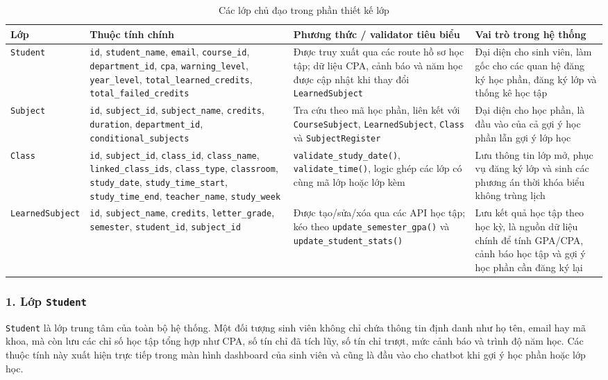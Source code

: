 \documentclass[12pt,a4paper]{report}
\begin{document}
\begin{table}[H]
\centering
\renewcommand{\arraystretch}{1.35}
\begin{tabularx}{\textwidth}{|l|X|X|X|}
\hline
\rowcolor[HTML]{D9EAD3}
\textbf{Lớp} & \textbf{Thuộc tính chính} & \textbf{Phương thức / validator tiêu biểu} & \textbf{Vai trò trong hệ thống} \\ \hline
\texttt{Student} & \texttt{id}, \texttt{student\_name}, \texttt{email}, \texttt{course\_id}, \texttt{department\_id}, \texttt{cpa}, \texttt{warning\_level}, \texttt{year\_level}, \texttt{total\_learned\_credits}, \texttt{total\_failed\_credits} & Được truy xuất qua các route hồ sơ học tập; dữ liệu CPA, cảnh báo và năm học được cập nhật khi thay đổi \texttt{LearnedSubject} & Đại diện cho sinh viên, làm gốc cho các quan hệ đăng ký học phần, đăng ký lớp và thống kê học tập \\ \hline
\texttt{Subject} & \texttt{id}, \texttt{subject\_id}, \texttt{subject\_name}, \texttt{credits}, \texttt{duration}, \texttt{department\_id}, \texttt{conditional\_subjects} & Tra cứu theo mã học phần, liên kết với \texttt{CourseSubject}, \texttt{LearnedSubject}, \texttt{Class} và \texttt{SubjectRegister} & Đại diện cho học phần, là đầu vào của cả gợi ý học phần lẫn gợi ý lớp học \\ \hline
\texttt{Class} & \texttt{id}, \texttt{subject\_id}, \texttt{class\_id}, \texttt{class\_name}, \texttt{linked\_class\_ids}, \texttt{class\_type}, \texttt{classroom}, \texttt{study\_date}, \texttt{study\_time\_start}, \texttt{study\_time\_end}, \texttt{teacher\_name}, \texttt{study\_week} & \texttt{validate\_study\_date()}, \texttt{validate\_time()}, logic ghép các lớp có cùng mã lớp hoặc lớp kèm & Lưu thông tin lớp mở, phục vụ đăng ký lớp và sinh các phương án thời khóa biểu không trùng lịch \\ \hline
\texttt{LearnedSubject} & \texttt{id}, \texttt{subject\_name}, \texttt{credits}, \texttt{letter\_grade}, \texttt{semester}, \texttt{student\_id}, \texttt{subject\_id} & Được tạo/sửa/xóa qua các API học tập; kéo theo \texttt{update\_semester\_gpa()} và \texttt{update\_student\_stats()} & Lưu kết quả học tập theo học kỳ, là nguồn dữ liệu chính để tính GPA/CPA, cảnh báo học tập và gợi ý học phần cần đăng ký lại \\ \hline
\end{tabularx}
\caption{Các lớp chủ đạo trong phần thiết kế lớp}
\end{table}

\subsubsection{1. Lớp \texttt{Student}}
\texttt{Student} là lớp trung tâm của toàn bộ hệ thống. Một đối tượng sinh viên không chỉ chứa thông tin định danh như họ tên, email hay mã khoa, mà còn lưu các chỉ số học tập tổng hợp như CPA, số tín chỉ đã tích lũy, số tín chỉ trượt, mức cảnh báo và trình độ năm học. Các thuộc tính này xuất hiện trực tiếp trong màn hình dashboard của sinh viên và cũng là đầu vào cho chatbot khi gợi ý học phần hoặc lớp học.
\end{document}

